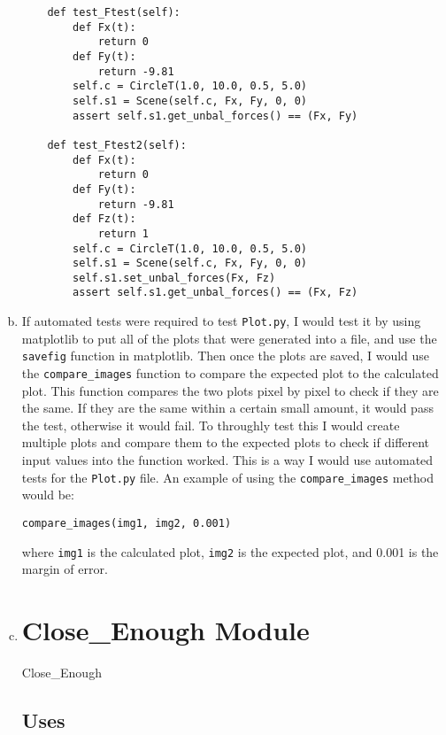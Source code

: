 \documentclass[12pt]{article}
\begin{document}
\begin{enumerate}[a)]
\begin{verbatim}
    def test_Ftest(self):
        def Fx(t):
            return 0
        def Fy(t):
            return -9.81
        self.c = CircleT(1.0, 10.0, 0.5, 5.0)
        self.s1 = Scene(self.c, Fx, Fy, 0, 0)
        assert self.s1.get_unbal_forces() == (Fx, Fy)

    def test_Ftest2(self):
        def Fx(t):
            return 0
        def Fy(t):
            return -9.81
        def Fz(t):
            return 1
        self.c = CircleT(1.0, 10.0, 0.5, 5.0)
        self.s1 = Scene(self.c, Fx, Fy, 0, 0)
        self.s1.set_unbal_forces(Fx, Fz)
        assert self.s1.get_unbal_forces() == (Fx, Fz)
\end{verbatim}

\item If automated tests were required to test \verb|Plot.py|, I would test it by using 
matplotlib to put all of the plots that were generated into a file,  and use the \verb|savefig| 
function in matplotlib. Then once the plots are saved, I would use the \verb|compare_images| 
function to compare the expected plot to the calculated plot. This function compares the two 
plots pixel by pixel to check if they are the same. If they are the same within a certain small 
amount, it would pass the test, otherwise it would fail. To throughly test this I would create 
multiple plots and compare them to the expected plots to check if different input values into the 
function worked. This is a way I would use automated tests for the \verb|Plot.py| file. An example of using the \verb|compare_images| method would be:

\begin{verbatim} 
compare_images(img1, img2, 0.001)
\end{verbatim} 

where \verb|img1| is the calculated plot, \verb|img2| is the expected plot, and 0.001 is the 
margin of error. 

\newpage

\item 

\section* {Close\_Enough Module}

Close\_Enough

\subsection* {Uses}


\end{enumerate}
\end{document}
